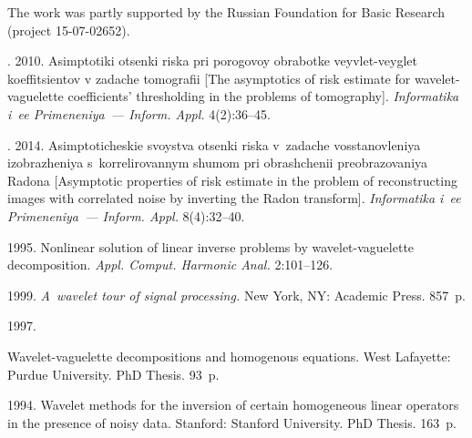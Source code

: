 

\vspace*{-9pt}

\Ack
\noindent
The work was partly supported by the Russian Foundation for 
Basic Research (project 15-07-02652).



  \begin{multicols}{2}

\renewcommand{\bibname}{\protect\rmfamily References}

{\small\frenchspacing
 {%
 \begin{thebibliography}{99}

. 
2010. Asimptotiki otsenki riska pri porogovoy obrabotke veyvlet-veyglet 
koeffitsientov v zadache tomografii
[The asymptotics of risk estimate for wavelet-vaguelette 
coefficients' thresholding in the problems of tomography]. 
\textit{Informatika i~ee Primeneniya~--- Inform. Appl.} 4(2):36--45.

. 2014. 
Asimpto\-ti\-che\-skie svoystva otsenki riska v~zadache vosstanovleniya izob\-ra\-zhe\-niya 
s~korrelirovannym shumom pri obrashchenii preobrazovaniya Radona 
[Asymptotic properties of risk estimate in the problem of reconstructing 
images with correlated noise by inverting the Radon transform]. 
\textit{Informatika i~ee Primeneniya~--- Inform. Appl.} 8(4):32--40.

 1995. 
Nonlinear solution of linear inverse problems by wavelet-vaguelette decomposition. 
\textit{Appl. Comput. Harmonic Anal.}  2:101--126.

 1999. 
\textit{A~wavelet tour of signal processing.}  New York, NY: Academic Press. 857~p.

 1997. {Wavelet-vaguelette decompositions and homogenous equations.
 West Lafayette: Purdue University.  PhD Thesis. 93~p.

 1994. 
Wavelet methods for the inversion of certain homogeneous linear operators 
in the presence of noisy data.  Stanford: Stanford University. 
PhD Thesis. 163~p.

}
\end{thebibliography}}}
\end{multicols}
